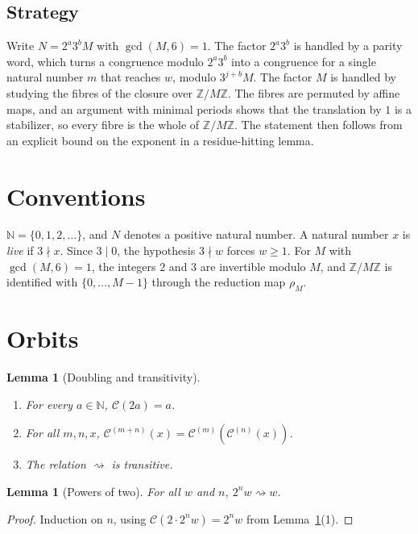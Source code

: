 \documentclass[11pt,reqno,oneside]{amsart}
\theoremstyle{plain}
\newtheorem{lemma}[theorem]{Lemma}
\theoremstyle{definition}
\numberwithin{equation}{section}
\begin{document}
\subsection*{Strategy}
Write $N=2^a3^bM$ with $\gcd(M,6)=1$. The factor $2^a3^b$ is handled by a parity word, which turns a congruence modulo $2^a3^b$ into a congruence for a single natural number $m$ that reaches $w$, modulo $3^{j+b}M$. The factor $M$ is handled by studying the fibres of the closure over $\mathbb Z/M\mathbb Z$. The fibres are permuted by affine maps, and an argument with minimal periods shows that the translation by $1$ is a stabilizer, so every fibre is the whole of $\mathbb Z/M\mathbb Z$. The statement then follows from an explicit bound on the exponent in a residue-hitting lemma.

\section{Conventions}\label{sec:conventions}

$\mathbb N=\{0,1,2,\dots\}$, and $N$ denotes a positive natural number. A natural number $x$ is \emph{live} if $3\nmid x$. Since $3\mid0$, the hypothesis $3\nmid w$ forces $w\ge1$. For $M$ with $\gcd(M,6)=1$, the integers $2$ and $3$ are invertible modulo $M$, and $\mathbb Z/M\mathbb Z$ is identified with $\{0,\dots,M-1\}$ through the reduction map $\rho_M$.

\section{Orbits}\label{sec:orbits}

\begin{lemma}[Doubling and transitivity]\label{lem:orbits}
\leavevmode
\begin{enumerate}[label=(\arabic*), leftmargin=2em]
\item For every $a\in\mathbb N$, $\mathcal C(2a)=a$.
\item For all $m,n,x$, $\mathcal C^{(m+n)}(x)=\mathcal C^{(m)}(\mathcal C^{(n)}(x))$.
\item The relation $\rightsquigarrow$ is transitive.
\end{enumerate}
\end{lemma}

\begin{lemma}[Powers of two]\label{lem:pow2}
For all $w$ and $n$, $2^nw\rightsquigarrow w$.
\end{lemma}
\begin{proof}
Induction on $n$, using $\mathcal C(2\cdot2^nw)=2^nw$ from Lemma~\ref{lem:orbits}(1).
\end{proof}
\end{document}
